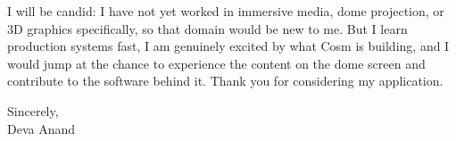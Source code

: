 \documentclass[letterpaper,11pt]{article}
\begin{document}
I will be candid: I have not yet worked in immersive media, dome projection, or 3D graphics specifically, so that domain would be new to me. But I learn production systems fast, I am genuinely excited by what Cosm is building, and I would jump at the chance to experience the content on the dome screen and contribute to the software behind it. Thank you for considering my application.

\vspace{6pt}
\noindent Sincerely, \\
Deva Anand
\end{document}
